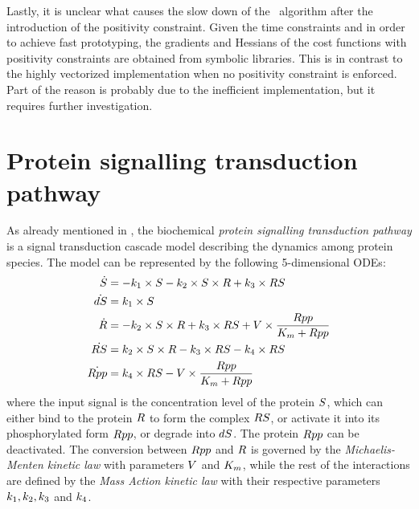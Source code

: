 Lastly, it is unclear what causes the slow down of the \algolpmf\  algorithm after the introduction of the positivity constraint.
Given the time constraints and in order to achieve fast prototyping, the gradients and Hessians of the cost functions with positivity constraints are obtained from symbolic libraries.
This is in contrast to the highly vectorized implementation when no positivity constraint is enforced.
Part of the reason is probably due to the inefficient implementation, but it requires further investigation.

\section{Protein signalling transduction pathway}
\label{sec-protein-signalling-transduction-pathway}

As already mentioned in , the biochemical \emph{protein signalling transduction pathway} \citep{vyshemirsky2007bayesian} is a signal transduction cascade model describing the dynamics among protein species.
The model can be represented by the following 5-dimensional ODEs:
\begin{align}
    \dot{S} 
    & = 
    -k_{1} \times S 
    -k_{2} \times S \times R
    + k_{3} \times RS
    \nonumber
    \\
    \dot{dS}
    & = 
    k_{1} \times S    
    \nonumber
    \\
    \dot{R}
    & =
    -k_{2} \times S \times R 
    + k_{3} \times RS
    + V \times \frac{Rpp}{K_{m} + Rpp}
    \nonumber
    \\
    \dot{RS}
    & =
    k_{2} \times S \times R
    - k_{3} \times RS
    - k_{4} \times RS
    \nonumber
    \\
    \dot{Rpp} 
    & =
    k_{4} \times RS - V \times \frac{Rpp}{K_{m} + Rpp}
\end{align}
where the input signal is the concentration level of the protein $S$, which can either bind to the protein $R$ to form the complex $RS$, or activate it into its phosphorylated form $Rpp$, or degrade into $dS$.
The protein $Rpp$ can be deactivated.
The conversion between $Rpp$ and $R$ is governed by the \emph{Michaelis-Menten kinetic law} with parameters $V$ and $K_{m}$, while the rest of the interactions are defined by the \emph{Mass Action kinetic law} with their respective parameters $k_{1}, k_{2}, k_{3}$ and $k_{4}$.

